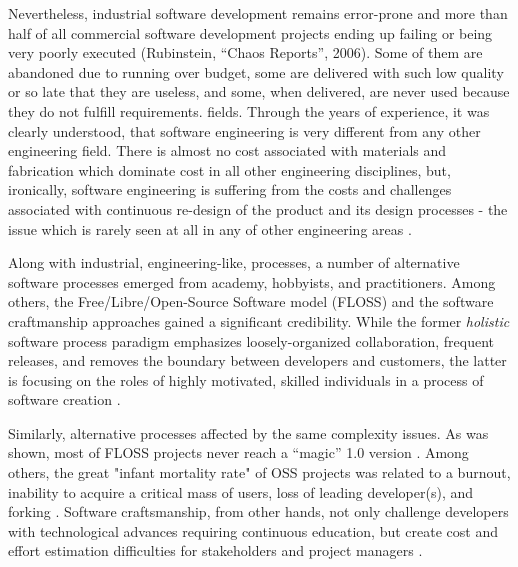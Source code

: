 Nevertheless, industrial software development remains error-prone and more than half of all commercial software
development projects ending up failing or being very poorly executed (Rubinstein, ``Chaos Reports'', 2006). 
Some of them are abandoned due to running over budget, some are delivered with such low quality or so late that
they are useless, and some, when delivered, are never used because they do not fulfill requirements. 
fields. Through the years of experience, it was clearly understood, that software engineering is
very different from any other engineering field. There is almost no cost associated with materials 
and fabrication which dominate cost in all other engineering disciplines, but, ironically, 
software engineering is suffering from the costs and challenges associated with continuous 
re-design of the product and its design processes - the issue which is rarely seen at all 
in any of other engineering areas \cite{citeulike:5203446}.

Along with industrial, engineering-like, processes, a number of alternative software processes emerged from
academy, hobbyists, and practitioners. 
Among others, the Free/Libre/Open-Source Software model (FLOSS) and the software craftmanship  
approaches gained a significant credibility. While the former \textit{holistic} software process paradigm emphasizes
loosely-organized collaboration, frequent releases, and removes the boundary between developers and customers, 
the latter is focusing on the roles of highly motivated, skilled individuals in a process of software creation
\cite{citeulike:262020} \cite{citeulike:2759198}. 

Similarly, alternative processes affected by the same complexity issues. As was shown, most of FLOSS projects 
never reach a ``magic'' 1.0 version \cite{citeulike:12480029}. Among others, the great "infant mortality rate" of OSS
projects was related to a burnout, inability to acquire a critical mass of users, loss of leading developer(s), and
forking \cite{richter2007critique}. Software craftsmanship, from other hands, not only challenge developers
with technological advances requiring continuous education, but create cost and effort estimation difficulties for
stakeholders and project managers \cite{citeulike:11058784}.


